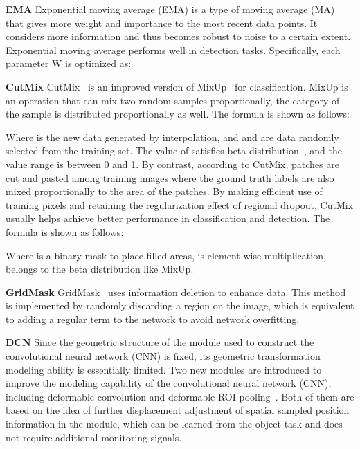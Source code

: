 \documentclass[10pt,twocolumn,letterpaper]{article}
\begin{document}
{\bf EMA} Exponential moving average (EMA) is a type of moving average (MA) that gives more weight and importance to the most recent data points. It considers more information and thus becomes robust to noise to a certain extent. Exponential moving average performs well in detection tasks. Specifically, each parameter W is optimized as:
    
    
{\bf CutMix} CutMix~\cite{yun2019cutmix} is an improved version of MixUp~\cite{zhang2017mixup} for classification. MixUp is an operation that can mix two random samples proportionally, the category of the sample is distributed proportionally as well. The formula is shown as follows:
    
    Where  is the new data generated by interpolation, and  and  are data randomly selected from the training set. The value of  satisfies beta distribution~\cite{gupta2004handbook}, and the value range is between 0 and 1. By contrast, according to CutMix, patches are cut and pasted among training images where the ground truth labels are also mixed proportionally to the area of the patches. By making efficient use of training pixels and retaining the regularization effect of regional dropout, CutMix usually helps achieve better performance in classification and detection. The formula is shown as follows:
    
    Where  is a binary mask to place filled areas,  is element-wise multiplication,  belongs to the beta distribution like MixUp.

    {\bf GridMask} GridMask~\cite{chen2020gridmask} uses information deletion to enhance data. This method is implemented by randomly discarding a region on the image, which is equivalent to adding a regular term to the network to avoid network overfitting.

    {\bf DCN} Since the geometric structure of the module used to construct the convolutional neural network (CNN) is fixed, its geometric transformation modeling ability is essentially limited. Two new modules are introduced to improve the modeling capability of the convolutional neural network (CNN), including deformable convolution and deformable ROI pooling~\cite{dai2017deformable}. Both of them are based on the idea of further displacement adjustment of spatial sampled position information in the module, which can be learned from the object task and does not require additional monitoring signals.
    
\end{document}
